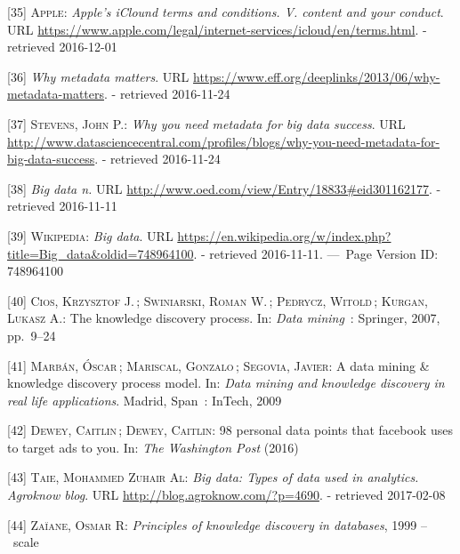 \documentclass[12pt,english,a4paper,titlepage,cleardoublepage=empty,dottedtoc]{report}
\begin{document}
\hypertarget{ref-web_2016_apple-icloud_terms-of-service}{}
{[}35{]} \textsc{Apple}: \emph{Apple's iClound terms and conditions. V.
content and your conduct}. URL
\url{https://www.apple.com/legal/internet-services/icloud/en/terms.html}.
- retrieved 2016-12-01

\hypertarget{ref-web_2013_why-metadata-matters}{}
{[}36{]} \emph{Why metadata matters}. URL
\url{https://www.eff.org/deeplinks/2013/06/why-metadata-matters}. -
retrieved 2016-11-24

\hypertarget{ref-web_2016_why-you-need-metadata-for-big-data-to-success}{}
{[}37{]} \textsc{Stevens, John P.}: \emph{Why you need metadata for big
data success}. URL
\url{http://www.datasciencecentral.com/profiles/blogs/why-you-need-metadata-for-big-data-success}.
- retrieved 2016-11-24

\hypertarget{ref-web_2016_oxford_definition_big-data}{}
{[}38{]} \emph{Big data n.} URL
\url{http://www.oed.com/view/Entry/18833\#eid301162177}. - retrieved
2016-11-11

\hypertarget{ref-web_2016_wikipedia_definition_big-data}{}
{[}39{]} \textsc{Wikipedia}: \emph{Big data}. URL
\url{https://en.wikipedia.org/w/index.php?title=Big_data\&oldid=748964100}.
- retrieved 2016-11-11. ---~Page Version ID: 748964100

\hypertarget{ref-chapter_2007_the-knowledge-discovery-process}{}
{[}40{]} \textsc{Cios, Krzysztof J.}\,; \textsc{Swiniarski, Roman W.}\,;
\textsc{Pedrycz, Witold}\,; \textsc{Kurgan, Lukasz A.}: The knowledge
discovery process. In: \emph{Data mining}~: Springer, 2007, pp.~9--24

\hypertarget{ref-paper_2009_a-data-mining-knowledge-discovery-process-model}{}
{[}41{]} \textsc{Marbán, Óscar}\,; \textsc{Mariscal, Gonzalo}\,;
\textsc{Segovia, Javier}: A data mining \& knowledge discovery process
model. In: \emph{Data mining and knowledge discovery in real life
applications}. Madrid, Span~: InTech, 2009

\hypertarget{ref-web_2016_facebook-utilizes-98-data-points}{}
{[}42{]} \textsc{Dewey, Caitlin}\,; \textsc{Dewey, Caitlin}: 98 personal
data points that facebook uses to target ads to you. In: \emph{The
Washington Post} (2016)

\hypertarget{ref-web_2016_big-data-types-of-data-used-in-analytics}{}
{[}43{]} \textsc{Taie, Mohammed Zuhair Al}: \emph{Big data: Types of
data used in analytics. Agroknow blog}. URL
\url{http://blog.agroknow.com/?p=4690}. - retrieved 2017-02-08

\hypertarget{ref-book-chapter_1999_Principles-of-knowledge-discovery-in-databases_introduction-to-data-mining}{}
{[}44{]} \textsc{Zaïane, Osmar R}: \emph{Principles of knowledge
discovery in databases}, 1999 --~scale
\end{document}
